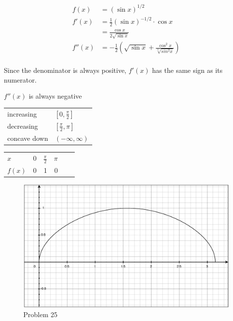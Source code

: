 \documentclass[fleqn]{exam}
\begin{document}
\begin{description}
\pagebreak

\item[25]
\begin{align*}
  f(x)   &= (\sin x)^{1/2} \\
  f'(x)  &= \frac{1}{2}(\sin x)^{-1/2}\cdot \cos x \\
         &= \frac{\cos x}{2 \sqrt{\sin x}} \\
  f''(x) &= -\frac{1}{2} \left( \sqrt{\sin x} + \frac{\cos^2 x}{\sqrt[3]{sin^2 x}} \right) \\
\end{align*}

\begin{itemize*}
  \item Since the denominator is always positive, $f'(x)$ has the same sign as its numerator.
  \item $f''(x)$ is always negative
\end{itemize*}

\begin{tabular}{ll}
\toprule
increasing & $\left[0, \frac{\pi}{2} \right]$ \\
decreasing & $\left[\frac{\pi}{2}, \pi \right]$ \\
\midrule
concave down & $(-\infty, \infty)$ \\
\bottomrule
\end{tabular}

\begin{tabular}{lrrrrr}
\toprule
$x$    & 0 & $\frac{\pi}{2}$ &  $\pi$ \\
$f(x)$ & 0 &               1 &     0  \\
\bottomrule
\end{tabular}

\begin{figure}[H]
  \centering
  \includegraphics[scale=.3]{problem_25.eps}
  \caption*{Problem 25}
\end{figure}


\end{description}
\end{document}
